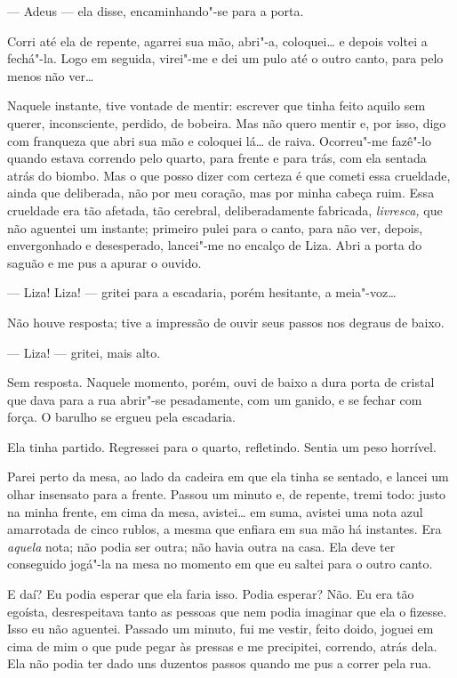 --- Adeus --- ela disse, encaminhando"-se para a porta.

Corri até ela de repente, agarrei sua mão, abri"-a, coloquei\ldots{} e depois
voltei a fechá"-la. Logo em seguida, virei"-me e dei um pulo até o outro
canto, para pelo menos não ver\ldots{}

Naquele instante, tive vontade de mentir: escrever que tinha feito
aquilo sem querer, inconsciente, perdido, de bobeira. Mas não quero
mentir e, por isso, digo com franqueza que abri sua mão e coloquei lá\ldots{}
de raiva. Ocorreu"-me fazê"-lo quando estava correndo pelo quarto, para
frente e para trás, com ela sentada atrás do biombo. Mas o que posso
dizer com certeza é que cometi essa crueldade, ainda que deliberada, não
por meu coração, mas por minha cabeça ruim. Essa crueldade era tão
afetada, tão cerebral, deliberadamente fabricada, \emph{livresca,} que
não aguentei um instante; primeiro pulei para o canto, para não ver,
depois, envergonhado e desesperado, lancei"-me no encalço de Liza. Abri a
porta do saguão e me pus a apurar o ouvido.

--- Liza! Liza! --- gritei para a escadaria, porém hesitante, a meia"-voz\ldots{}

Não houve resposta; tive a impressão de ouvir seus passos nos degraus de
baixo.

--- Liza! --- gritei, mais alto.

Sem resposta. Naquele momento, porém, ouvi de baixo a dura porta de
cristal que dava para a rua abrir"-se pesadamente, com um ganido, e se
fechar com força. O barulho se ergueu pela escadaria.

Ela tinha partido. Regressei para o quarto, refletindo. Sentia um peso
horrível.

Parei perto da mesa, ao lado da cadeira em que ela tinha se sentado, e
lancei um olhar insensato para a frente. Passou um minuto e, de repente,
tremi todo: justo na minha frente, em cima da mesa, avistei\ldots{} em suma,
avistei uma nota azul amarrotada de cinco rublos, a mesma que enfiara em
sua mão há instantes. Era \emph{aquela} nota; não podia ser outra; não
havia outra na casa. Ela deve ter conseguido jogá"-la na mesa no momento
em que eu saltei para o outro canto.

E daí? Eu podia esperar que ela faria isso. Podia esperar? Não. Eu era
tão egoísta, desrespeitava tanto as pessoas que nem podia imaginar que
ela o fizesse. Isso eu não aguentei. Passado um minuto, fui me vestir,
feito doido, joguei em cima de mim o que pude pegar às pressas e me
precipitei, correndo, atrás dela. Ela não podia ter dado uns duzentos
passos quando me pus a correr pela rua.

